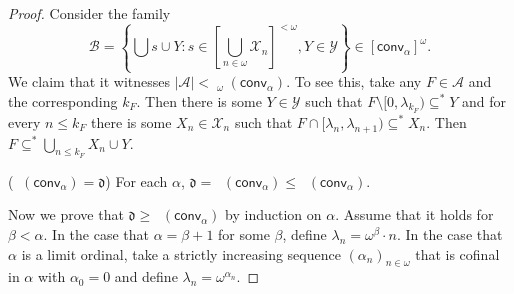 \documentclass{amsart}
\theoremstyle{plain}
\theoremstyle{definition}
\theoremstyle{remark}
\newcommand{\cA}{\mathcal{A}}
\newcommand{\cB}{\mathcal{B}}
\newcommand{\dnumber}{\mathfrak{d}}
\DeclareMathOperator{\add}{add}
\DeclareMathOperator{\cof}{cof}
\DeclareMathOperator{\adds}{\add^*}
\DeclareMathOperator{\cofs}{\cof^*}
\DeclareMathOperator{\cofo}{\cof^*_{\omega}}
\newcommand{\conv}{\mathsf{conv}}
\renewcommand{\subset}{\subseteq}
\begin{document}
\begin{proof}
      Consider the family $$\cB=\left\{\bigcup s\cup Y : s\in\left[\bigcup_{n\in\omega} \mathcal{X}_n\right]^{<\omega}, Y\in\mathcal{Y}\right\}\in [\conv_\alpha ]^\omega. $$ We claim that it witnesses $|\cA|<\adds_\omega(\conv_{\alpha})$. To see this, take any $F\in\cA$ and the corresponding $k_F$. Then there is some $Y\in\mathcal{Y}$ such that $F\setminus [0,\lambda_{ k_F})\subset^*Y$ and for every $n\leq k_F$  there is some $X_n\in\mathcal{X}_n$ such that $F\cap[\lambda_n, \lambda_{n+1})\subset^*X_n$. Then $F\subset^*\bigcup_{n\leq k_F}X_n\cup Y$.





    

    ($\cofo(\conv_\alpha)=\dnumber$) 
     For each $\alpha$, $\dnumber=\cofs(\conv_\alpha)\leq\cofo(\conv_\alpha)$. 

     Now we prove that $\dnumber \geq \cofo(\conv_\alpha)$ by induction on $\alpha$. Assume that it holds for $\beta < \alpha$.
     In the case that $\alpha=\beta+1$ for some $\beta$, define $\lambda_n=\omega^\beta\cdot n$. In the case that $\alpha$ is a limit ordinal, take a strictly increasing sequence $(\alpha_n)_{n\in\omega}$ that is cofinal in $\alpha$ with $\alpha_0=0$ and define $\lambda_n=\omega^{\alpha_n}$.


\end{proof}
\end{document}

